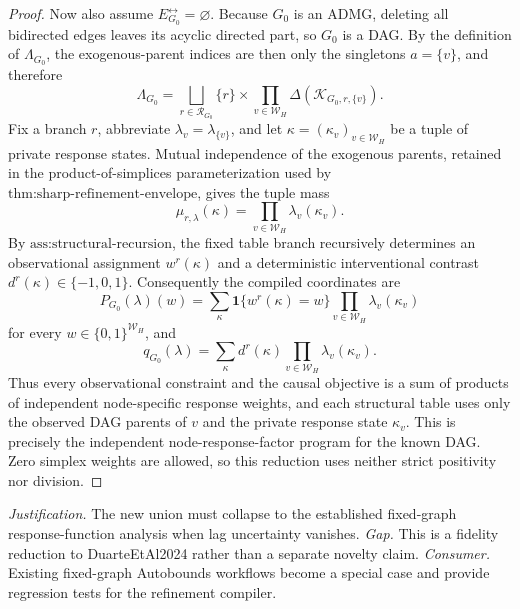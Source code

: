 \documentclass{article}
\begin{document}
\begin{proof}
Now also assume \(E_{G_0}^{\leftrightarrow}=\varnothing\).  Because \(G_0\) is an ADMG, deleting all bidirected edges leaves its acyclic directed part, so \(G_0\) is a DAG.  By the definition of \(\Lambda_{G_0}\), the exogenous-parent indices are then only the singletons \(a=\{v\}\), and therefore
\[
\Lambda_{G_0}
=\bigsqcup_{r\in\mathcal R_{G_0}}
\{r\}\times
\prod_{v\in\mathcal W_H}
\Delta(\mathcal K_{G_0,r,\{v\}}).
\]
Fix a branch \(r\), abbreviate \(\lambda_v=\lambda_{\{v\}}\), and let
\(\kappa=(\kappa_v)_{v\in\mathcal W_H}\) be a tuple of private response states.  Mutual independence of the exogenous parents, retained in the product-of-simplices parameterization used by \(\text{thm:sharp-refinement-envelope}\), gives the tuple mass
\[
\mu_{r,\lambda}(\kappa)
=\prod_{v\in\mathcal W_H}\lambda_v(\kappa_v).
\]
By \(\text{ass:structural-recursion}\), the fixed table branch recursively determines an observational assignment \(w^r(\kappa)\) and a deterministic interventional contrast \(d^r(\kappa)\in\{-1,0,1\}\).  Consequently the compiled coordinates are
\[
P_{G_0}(\lambda)(w)
=\sum_{\kappa}
\mathbf 1\{w^r(\kappa)=w\}
\prod_{v\in\mathcal W_H}\lambda_v(\kappa_v)
\]
for every \(w\in\{0,1\}^{\mathcal W_H}\), and
\[
q_{G_0}(\lambda)
=\sum_{\kappa}d^r(\kappa)
\prod_{v\in\mathcal W_H}\lambda_v(\kappa_v).
\]
Thus every observational constraint and the causal objective is a sum of products of independent node-specific response weights, and each structural table uses only the observed DAG parents of \(v\) and the private response state \(\kappa_v\).  This is precisely the independent node-response-factor program for the known DAG.  Zero simplex weights are allowed, so this reduction uses neither strict positivity nor division.
\end{proof}
\par\smallskip\noindent \textit{Justification.} The new union must collapse to the established fixed-graph response-function analysis when lag uncertainty vanishes. \textit{Gap.} This is a fidelity reduction to DuarteEtAl2024 rather than a separate novelty claim. \textit{Consumer.} Existing fixed-graph Autobounds workflows become a special case and provide regression tests for the refinement compiler.
\end{document}
